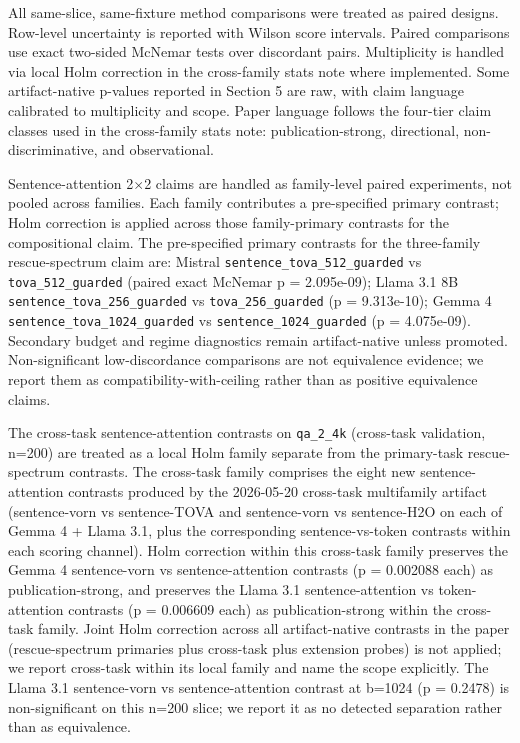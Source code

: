 \documentclass[10pt]{article}
\begin{document}
All same-slice, same-fixture method comparisons were treated as paired
designs. Row-level uncertainty is reported with Wilson score intervals.
Paired comparisons use exact two-sided McNemar tests over discordant
pairs. Multiplicity is handled via local Holm correction in the
cross-family stats note where implemented. Some artifact-native p-values
reported in Section 5 are raw, with claim language calibrated to
multiplicity and scope. Paper language follows the four-tier claim
classes used in the cross-family stats note: publication-strong,
directional, non-discriminative, and observational.

Sentence-attention 2$\times$2 claims are handled as family-level paired
experiments, not pooled across families. Each family contributes a
pre-specified primary contrast; Holm correction is applied across those
family-primary contrasts for the compositional claim. The pre-specified
primary contrasts for the three-family rescue-spectrum claim are:
Mistral \texttt{sentence\_tova\_512\_guarded} vs
\texttt{tova\_512\_guarded} (paired exact McNemar p = 2.095e-09); Llama
3.1 8B \texttt{sentence\_tova\_256\_guarded} vs
\texttt{tova\_256\_guarded} (p = 9.313e-10); Gemma 4
\texttt{sentence\_tova\_1024\_guarded} vs
\texttt{sentence\_1024\_guarded} (p = 4.075e-09). Secondary budget and
regime diagnostics remain artifact-native unless promoted.
Non-significant low-discordance comparisons are not equivalence
evidence; we report them as compatibility-with-ceiling rather than as
positive equivalence claims.

The cross-task sentence-attention contrasts on \texttt{qa\_2\_4k}
(cross-task validation, n=200) are treated as a local Holm family
separate from the primary-task rescue-spectrum contrasts. The cross-task
family comprises the eight new sentence-attention contrasts produced by
the 2026-05-20 cross-task multifamily artifact (sentence-vorn vs
sentence-TOVA and sentence-vorn vs sentence-H2O on each of
Gemma 4 + Llama 3.1, plus the corresponding sentence-vs-token contrasts
within each scoring channel). Holm correction within this cross-task
family preserves the Gemma 4 sentence-vorn vs sentence-attention
contrasts (p = 0.002088 each) as publication-strong, and preserves the
Llama 3.1 sentence-attention vs token-attention contrasts (p = 0.006609
each) as publication-strong within the cross-task family. Joint Holm
correction across all artifact-native contrasts in the paper
(rescue-spectrum primaries plus cross-task plus extension probes) is not
applied; we report cross-task within its local family and name the scope
explicitly. The Llama 3.1 sentence-vorn vs sentence-attention contrast
at b=1024 (p = 0.2478) is non-significant on this n=200 slice; we report
it as no detected separation rather than as equivalence.
\end{document}

